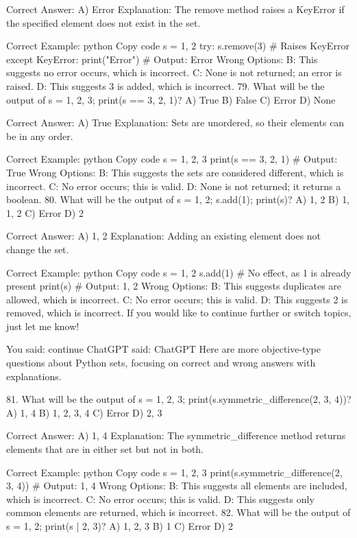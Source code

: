Correct Answer: A) Error
Explanation: The remove method raises a KeyError if the specified element does not exist in the set.

Correct Example:
python
Copy code
s = {1, 2}
try:
    s.remove(3)  # Raises KeyError
except KeyError:
    print("Error")  # Output: Error
Wrong Options:
B: This suggests no error occurs, which is incorrect.
C: None is not returned; an error is raised.
D: This suggests 3 is added, which is incorrect.
79. What will be the output of s = {1, 2, 3}; print(s == {3, 2, 1})?
A) True
B) False
C) Error
D) None

Correct Answer: A) True
Explanation: Sets are unordered, so their elements can be in any order.

Correct Example:
python
Copy code
s = {1, 2, 3}
print(s == {3, 2, 1})  # Output: True
Wrong Options:
B: This suggests the sets are considered different, which is incorrect.
C: No error occurs; this is valid.
D: None is not returned; it returns a boolean.
80. What will be the output of s = {1, 2}; s.add(1); print(s)?
A) {1, 2}
B) {1, 1, 2}
C) Error
D) {2}

Correct Answer: A) {1, 2}
Explanation: Adding an existing element does not change the set.

Correct Example:
python
Copy code
s = {1, 2}
s.add(1)  # No effect, as 1 is already present
print(s)  # Output: {1, 2}
Wrong Options:
B: This suggests duplicates are allowed, which is incorrect.
C: No error occurs; this is valid.
D: This suggests 2 is removed, which is incorrect.
If you would like to continue further or switch topics, just let me know!






You said:
continue
ChatGPT said:
ChatGPT
Here are more objective-type questions about Python sets, focusing on correct and wrong answers with explanations.

81. What will be the output of s = {1, 2, 3}; print(s.symmetric_difference({2, 3, 4}))?
A) {1, 4}
B) {1, 2, 3, 4}
C) Error
D) {2, 3}

Correct Answer: A) {1, 4}
Explanation: The symmetric_difference method returns elements that are in either set but not in both.

Correct Example:
python
Copy code
s = {1, 2, 3}
print(s.symmetric_difference({2, 3, 4}))  # Output: {1, 4}
Wrong Options:
B: This suggests all elements are included, which is incorrect.
C: No error occurs; this is valid.
D: This suggests only common elements are returned, which is incorrect.
82. What will be the output of s = {1, 2}; print(s | {2, 3})?
A) {1, 2, 3}
B) {1}
C) Error
D) {2}

